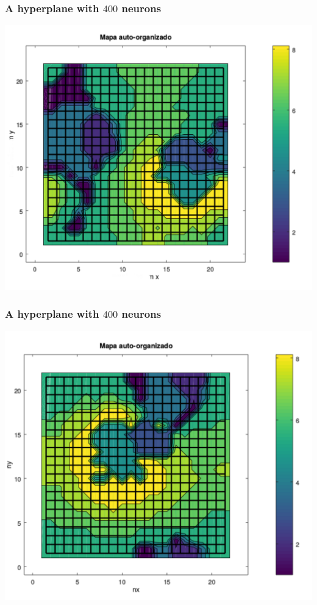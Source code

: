 \documentclass[aspectratio=10]{beamer} %
\begin{document}
\begin{frame}
\frametitle{A hyperplane with $400$ neurons}
\centering
\includegraphics[scale=0.47]{Imagens/SOM100_2d.pdf} 
\end{frame}

\begin{frame}
\frametitle{A hyperplane with $400$ neurons}
\centering
\includegraphics[scale=0.47]{Imagens/SOM1000_2d.pdf} 
\end{frame}
\end{document}
